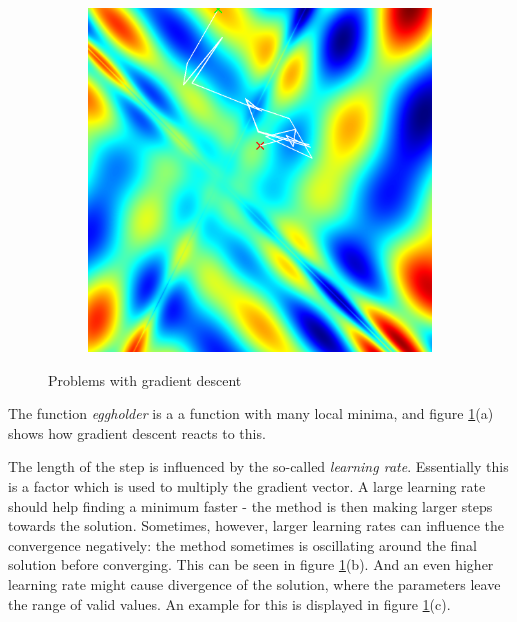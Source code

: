 \documentclass[sigconf,nonacm]{acmart}
\begin{document}
\begin{figure}[h]
\begin{subfigure}[c]{0.3\columnwidth}
  \end{subfigure}
  \hspace{2pt}
  \begin{subfigure}[c]{0.3\columnwidth}
    \includegraphics[width=\textwidth]{divergence.png}
  \end{subfigure}
\vspace{-.7\baselineskip}
\caption{Problems with gradient descent}
\label{p1:problems}
\end{figure}

The function \emph{eggholder} is a a function with many local minima,
and figure \ref{p1:problems}(a) shows how gradient descent reacts to this.

The length of the step is influenced by the so-called \emph{learning rate}.
Essentially this is a factor which is used to multiply the gradient vector.
A large learning rate should help finding a minimum faster - the method
is then making larger steps towards the solution.
Sometimes, however, larger learning rates can influence the convergence negatively:
the method sometimes is oscillating around the final solution before converging.
This can be seen in figure \ref{p1:problems}(b).
And an even higher learning rate might cause divergence of the solution,
where the parameters leave the range of valid values.
An example for this is displayed in figure \ref{p1:problems}(c).
\end{document}
